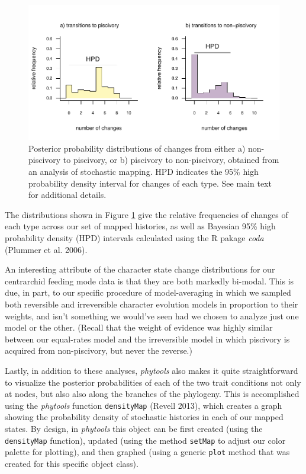 \documentclass[fleqn,10pt,lineno]{wlpeerj} %
\begin{document}
\begin{figure}
\includegraphics[width=1\linewidth]{Revell.phytools-v2_peerj_files/figure-latex/num-changes-1} \caption{Posterior probability distributions of changes from either a) non-piscivory to piscivory, or b) piscivory to non-piscivory, obtained from an analysis of stochastic mapping. HPD indicates the 95\% high probability density interval for changes of each type. See main text for additional details.}\label{fig:num-changes}
\end{figure}

The distributions shown in Figure \ref{fig:num-changes} give the relative frequencies of changes of each type across our set of mapped histories, as well as Bayesian 95\% high probability density (HPD) intervals calculated using the R pakage \emph{coda} (Plummer et al. 2006).

An interesting attribute of the character state change distributions for our centrarchid feeding mode data is that they are both markedly bi-modal. This is due, in part, to our specific procedure of model-averaging in which we sampled both reversible and irreversible character evolution models in proportion to their weights, and isn't something we would've seen had we chosen to analyze just one model or the other. (Recall that the weight of evidence was highly similar between our equal-rates model and the irreversible model in which piscivory is acquired from non-piscivory, but never the reverse.)

Lastly, in addition to these analyses, \emph{phytools} also makes it quite straightforward to visualize the posterior probabilities of each of the two trait conditions not only at nodes, but also also along the branches of the phylogeny. This is accomplished using the \emph{phytools} function \texttt{densityMap} (Revell 2013), which creates a graph showing the probability density of stochastic histories in each of our mapped states. By design, in \emph{phytools} this object can be first created (using the \texttt{densityMap} function), updated (using the method \texttt{setMap} to adjust our color palette for plotting), and then graphed (using a generic \texttt{plot} method that was created for this specific object class).
\end{document}
